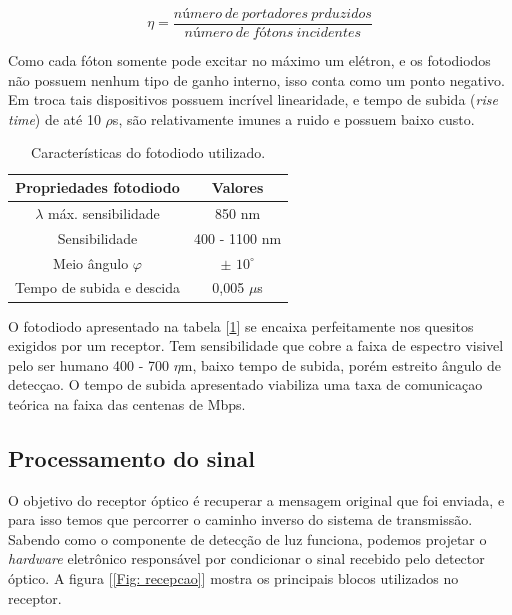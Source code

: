 \begin{equation}
\label{Eq: eficiencia_fotodiodo}
\eta = \frac{número\: de\: portadores\: prduzidos}{número\: de \:fótons\: incidentes}
\end{equation}

Como cada fóton somente pode excitar no máximo um elétron, e os fotodiodos não possuem nenhum tipo de ganho interno, isso conta como um ponto negativo. Em troca tais dispositivos possuem incrível linearidade, e tempo de subida (\textit{rise time}) de até 10 $\rho$s, são relativamente
imunes a ruido e possuem baixo custo. \cite{eg&goptoelectronics1997}

\begin{table}[h]
	\centering
	\begin{tabular}{cc}
		\toprule
		\textbf{Propriedades fotodiodo} & \textbf{Valores} \\
		\midrule
		$\lambda$ máx. sensibilidade & 850 nm\\
		Sensibilidade & 400 - 1100 nm \\
		Meio ângulo $\varphi$ & $\pm$ $10^{\circ}$  \\
		Tempo de subida e descida & 0,005 $\mu$s\\
		\bottomrule
	\end{tabular}
	\caption{Características do fotodiodo utilizado. \cite{osramoptosemiconductors2014}}
	\label{Tab: caracteristicas fotodiodo}
\end{table}

O fotodiodo apresentado na tabela [\ref{Tab: caracteristicas fotodiodo}] se encaixa perfeitamente nos quesitos exigidos por um receptor. Tem sensibilidade que cobre a faixa de espectro visivel pelo ser humano 400 - 700 $\eta$m, baixo tempo de subida, porém estreito ângulo de detecçao. O tempo de subida apresentado viabiliza uma taxa de comunicaçao teórica na faixa das centenas de Mbps.

\subsection{Processamento do sinal}

O objetivo do receptor óptico é recuperar a mensagem original que foi enviada, e para isso temos que percorrer o caminho inverso do sistema de transmissão.
Sabendo como o componente de detecção de luz funciona, podemos projetar o \textit{hardware} eletrônico responsável por condicionar o sinal recebido pelo detector óptico. 
A figura [\ref{Fig: recepcao}] mostra os principais blocos utilizados no receptor.

